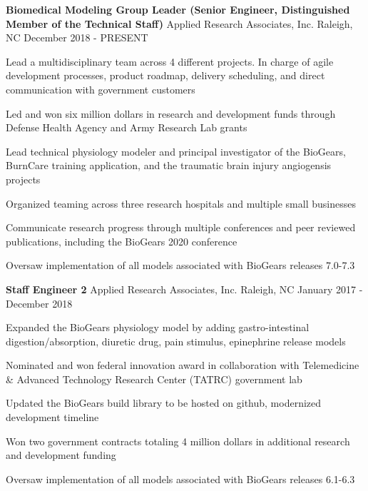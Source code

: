 
\begin{cventries}
  \cventry
    {\textbf{Biomedical Modeling Group Leader (Senior Engineer, Distinguished Member of the Technical Staff)}} %
    {Applied Research Associates, Inc.} %
    {Raleigh, NC} %
    {December 2018 - PRESENT} %
    {
      \begin{cvitems} %
        \item {Lead a multidisciplinary team across 4 different projects. In charge of agile development processes, product roadmap, delivery scheduling, and direct communication with government customers}
        \item {Led and won six million dollars in research and development funds through Defense Health Agency and Army Research Lab grants}
        \item {Lead technical physiology modeler and principal investigator of the BioGears, BurnCare training application, and the traumatic brain injury angiogensis projects}
        \item {Organized teaming across three research hospitals and multiple small businesses}
        \item {Communicate research progress through multiple conferences and peer reviewed publications, including the BioGears 2020 conference}
        \item {Oversaw implementation of all models associated with BioGears releases 7.0-7.3}
      \end{cvitems}
    }

  \cventry
    {\textbf{Staff Engineer 2}} %
    {Applied Research Associates, Inc.} %
    {Raleigh, NC} %
    {January 2017 - December 2018} %
    {
      \begin{cvitems} %
        \item {Expanded the BioGears physiology model by adding gastro-intestinal digestion/absorption, diuretic drug, pain stimulus, epinephrine release models}
        \item {Nominated and won federal innovation award in collaboration with Telemedicine \& Advanced Technology Research Center (TATRC) government lab}
        \item {Updated the BioGears build library to be hosted on github, modernized development timeline}
        \item {Won two government contracts totaling 4 million dollars in additional research and development funding}
        \item {Oversaw implementation of all models associated with BioGears releases 6.1-6.3}
      \end{cvitems}
    }


\end{cventries}
